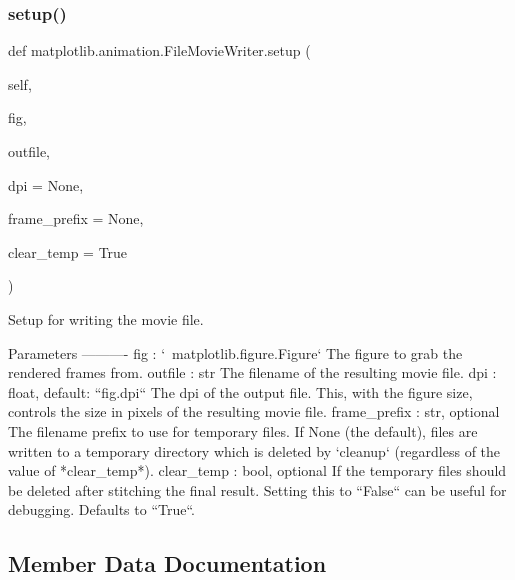 \mbox{\label{classmatplotlib_1_1animation_1_1FileMovieWriter_a79426b2dc3bc5c4eefac4f8197c56209}} 
\subsubsection{\texorpdfstring{setup()}{setup()}}
{\footnotesize\ttfamily def matplotlib.\+animation.\+File\+Movie\+Writer.\+setup (\begin{DoxyParamCaption}\item[{}]{self,  }\item[{}]{fig,  }\item[{}]{outfile,  }\item[{}]{dpi = {\ttfamily None},  }\item[{}]{frame\+\_\+prefix = {\ttfamily None},  }\item[{}]{clear\+\_\+temp = {\ttfamily True} }\end{DoxyParamCaption})}

\begin{DoxyVerb}Setup for writing the movie file.

Parameters
----------
fig : `~matplotlib.figure.Figure`
    The figure to grab the rendered frames from.
outfile : str
    The filename of the resulting movie file.
dpi : float, default: ``fig.dpi``
    The dpi of the output file. This, with the figure size,
    controls the size in pixels of the resulting movie file.
frame_prefix : str, optional
    The filename prefix to use for temporary files.  If None (the
    default), files are written to a temporary directory which is
    deleted by `cleanup` (regardless of the value of *clear_temp*).
clear_temp : bool, optional
    If the temporary files should be deleted after stitching
    the final result.  Setting this to ``False`` can be useful for
    debugging.  Defaults to ``True``.
\end{DoxyVerb}
 

\subsection{Member Data Documentation}
\mbox{\label{classmatplotlib_1_1animation_1_1FileMovieWriter_acb15d67886c11ad2174b258d7a340a45}} 
